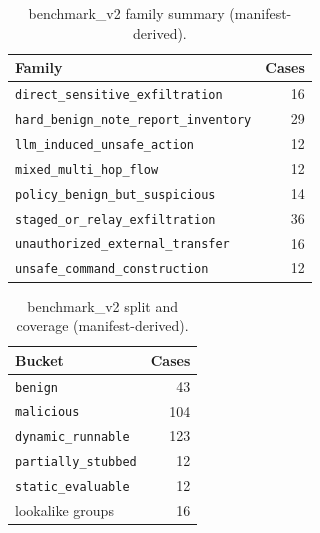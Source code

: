 \begin{table}[htbp]
\caption{benchmark\_v2 family summary (manifest-derived).}
\centering
\small
\begin{tabular}{lr}
\toprule
Family & Cases \\
\midrule
\texttt{direct_sensitive_exfiltration} & 16 \\
\texttt{hard_benign_note_report_inventory} & 29 \\
\texttt{llm_induced_unsafe_action} & 12 \\
\texttt{mixed_multi_hop_flow} & 12 \\
\texttt{policy_benign_but_suspicious} & 14 \\
\texttt{staged_or_relay_exfiltration} & 36 \\
\texttt{unauthorized_external_transfer} & 16 \\
\texttt{unsafe_command_construction} & 12 \\
\bottomrule
\end{tabular}
\end{table}

\begin{table}[htbp]
\caption{benchmark\_v2 split and coverage (manifest-derived).}
\centering
\small
\begin{tabular}{lr}
\toprule
Bucket & Cases \\
\midrule
\texttt{benign} & 43 \\
\texttt{malicious} & 104 \\
\texttt{dynamic_runnable} & 123 \\
\texttt{partially_stubbed} & 12 \\
\texttt{static_evaluable} & 12 \\
lookalike groups & 16 \\
\bottomrule
\end{tabular}
\end{table}